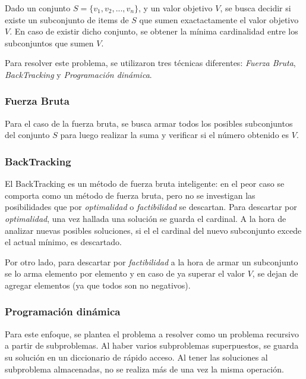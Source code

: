 \par Dado un conjunto $S = \{v_1,v_2,...,v_n\}$, y un valor objetivo $V$, se busca decidir si existe un subconjunto
de items de $S$ que sumen exactactamente el valor objetivo $V$. En caso de existir dicho conjunto, se obtener la
m\'inima cardinalidad entre los subconjuntos que sumen $V$.

\par Para resolver este problema, se utilizaron tres t\'ecnicas diferentes: \emph{Fuerza Bruta}, \emph{BackTracking}
y \emph{Programaci\'on din\'amica}.

\subsubsection{Fuerza Bruta}
\par Para el caso de la fuerza bruta, se busca armar todos los posibles subconjuntos del conjunto $S$ para luego realizar
la suma y verificar si el n\'umero obtenido es $V$.

\subsubsection{BackTracking}
\par El BackTracking es un m\'etodo de fuerza bruta inteligente: en el peor caso se comporta como un m\'etodo de fuerza
bruta, pero no se investigan las posibilidades que por \emph{optimalidad } o \emph{factibilidad} se descartan.
Para descartar por \emph{optimalidad}, una vez hallada una soluci\'on se guarda el cardinal. A la hora de analizar nuevas
posibles soluciones, si el el cardinal del nuevo subconjunto excede el actual m\'inimo, es descartado. \par
Por otro lado, para descartar por \emph{factibilidad} a la hora de armar un subconjunto se lo arma elemento por elemento
y en caso de ya superar el valor $V$, se dejan de agregar elementos (ya que todos son no negativos).


\subsubsection{Programaci\'on din\'amica}
\par Para este enfoque, se plantea el problema a resolver como un problema recursivo a partir de subproblemas.
Al haber varios subproblemas superpuestos, se guarda su soluci\'on en un diccionario de r\'apido acceso. Al tener las 
soluciones al subproblema almacenadas, no se realiza m\'as de una vez la misma operaci\'on.

